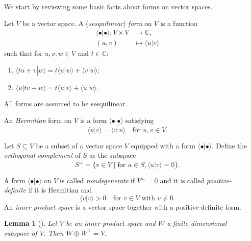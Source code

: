 \documentclass[a4paper, 12pt, reqno]{amsart}
\newtheorem{lemma}[theorem]{Lemma}
\theoremstyle{remark}
\numberwithin{equation}{subsection}
\begin{document}
We start by reviewing some basic facts about forms on vector spaces.

Let $V$ be a vector space.
A (\emph{sesquilinear}) \emph{form} on $V$ is a function
\begin{align*}
  \langle \bullet| \bullet\rangle: V \times V &\to \mathbb{C}, \\
  (u, v) &\mapsto \langle u| v\rangle
\end{align*}
such that for $u, v, w \in V$ and $t \in \mathbb{C}$:
\begin{enumerate}
\item $\langle tu + v| w\rangle = \overline{t}\langle u| w\rangle + \langle v| w\rangle$;
\item $\langle u| tv + w\rangle = t\langle u| v\rangle + \langle u| w\rangle$.
\end{enumerate}
All forms are assumed to be sesquilinear.

An \emph{Hermitian} form on $V$ is a form $\langle \bullet| \bullet\rangle$ satisfying
\begin{equation*}
  \langle u| v\rangle = \overline{\langle v| u\rangle} \quad \text{for }u, v \in V.
\end{equation*}

Let $S \subseteq V$ be a subset of a vector space $V$ equipped with a form $\langle \bullet| \bullet\rangle$.
Define the \emph{orthogonal complement} of $S$ as the subspace
\begin{equation*}
  S^{\perp} = \{v \in V \mid \text{for }u \in S, \langle u| v\rangle = 0\}.
\end{equation*}

A form $\langle \bullet| \bullet\rangle$ on $V$ is called \emph{nondegenerate} if $V^{\perp} = 0$ and it is called \emph{positive-definite} if it is Hermitian and
\begin{equation*}
  \langle v| v\rangle > 0 \quad \text{for }v \in V \text{ with }v \neq 0.
\end{equation*}
An \emph{inner product space} is a vector space together with a positive-definite form.

\begin{lemma}[{\cite[\S8.2 Theorem 5]{hoffman_linear_1971}}]
  \label{lmm:15}
  Let $V$ be an inner product space and $W$ a finite dimensional subspace of $V$.
  Then $W \oplus W^{\perp} = V$.
\end{lemma}
\end{document}
